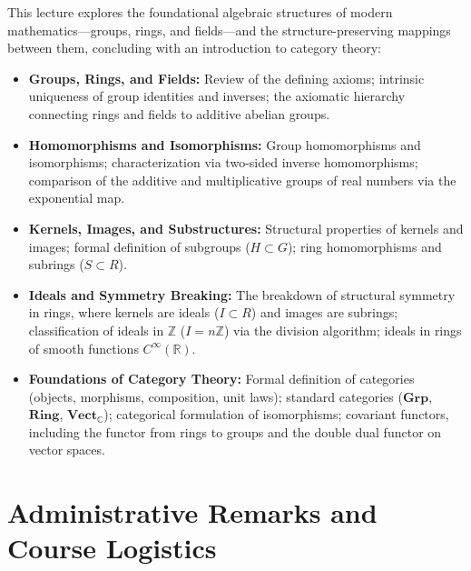 \begin{overview}
This lecture explores the foundational algebraic structures of modern mathematics---groups, rings, and fields---and the structure-preserving mappings between them, concluding with an introduction to category theory:
\begin{itemize}
    \item \textbf{Groups, Rings, and Fields:} Review of the defining axioms; intrinsic uniqueness of group identities and inverses; the axiomatic hierarchy connecting rings and fields to additive abelian groups.
    \item \textbf{Homomorphisms and Isomorphisms:} Group homomorphisms and isomorphisms; characterization via two-sided inverse homomorphisms; comparison of the additive and multiplicative groups of real numbers via the exponential map.
    \item \textbf{Kernels, Images, and Substructures:} Structural properties of kernels and images; formal definition of subgroups ($H \subset G$); ring homomorphisms and subrings ($S \subset R$).
    \item \textbf{Ideals and Symmetry Breaking:} The breakdown of structural symmetry in rings, where kernels are ideals ($I \subset R$) and images are subrings; classification of ideals in $\mathbb{Z}$ ($I = n\mathbb{Z}$) via the division algorithm; ideals in rings of smooth functions $C^\infty(\mathbb{R})$.
    \item \textbf{Foundations of Category Theory:} Formal definition of categories (objects, morphisms, composition, unit laws); standard categories ($\mathbf{Grp}$, $\mathbf{Ring}$, $\mathbf{Vect}_{\mathbb{C}}$); categorical formulation of isomorphisms; covariant functors, including the functor from rings to groups and the double dual functor on vector spaces.
\end{itemize}
\end{overview}

\section{Administrative Remarks and Course Logistics}

